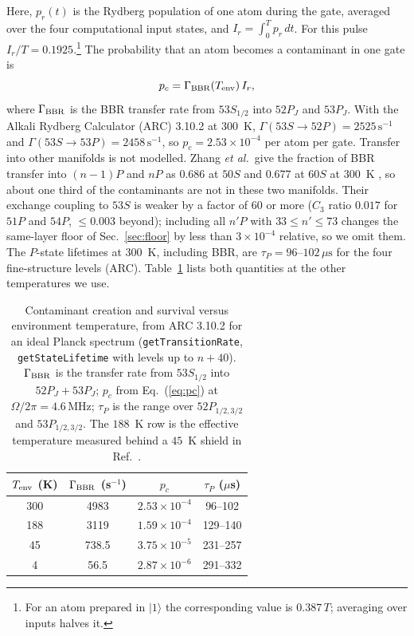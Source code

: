 \documentclass[aps,pra,twocolumn,superscriptaddress,longbibliography,floatfix]{revtex4-2}
\newcommand{\us}{\,\mu\mathrm{s}}
\newcommand{\MHz}{\,\mathrm{MHz}}
\begin{document}
Here, $p_r(t)$ is the Rydberg population of one atom during the gate, averaged over the four computational input states, and $I_r=\int_0^T p_r\,dt$. For this pulse $I_r/T=0.1925$.\footnote{For an atom prepared in $|1\rangle$ the corresponding value is $0.387\,T$; averaging over inputs halves it.} The probability that an atom becomes a contaminant in one gate is
\begin{equation}
p_c=\Gamma_{\rm BBR}(T_{\rm env})\,I_r ,
\label{eq:pc}
\end{equation}
where $\Gamma_{\rm BBR}$ is the BBR transfer rate from $53S_{1/2}$ into $52P_J$ and $53P_J$. With the Alkali Rydberg Calculator (ARC) 3.10.2 \cite{ARC} at $300$~K, $\Gamma(53S\to52P)=2525\,\mathrm{s}^{-1}$ and $\Gamma(53S\to53P)=2458\,\mathrm{s}^{-1}$, so $p_c=2.53\times10^{-4}$ per atom per gate. Transfer into other manifolds is not modelled. Zhang \textit{et al.}\ give the fraction of BBR transfer into $(n-1)P$ and $nP$ as $0.686$ at $50S$ and $0.677$ at $60S$ at $300$~K \cite{Zhang2026}, so about one third of the contaminants are not in these two manifolds. Their exchange coupling to $53S$ is weaker by a factor of 60 or more ($C_3$ ratio $0.017$ for $51P$ and $54P$, $\le0.003$ beyond); including all $n'P$ with $33\le n'\le73$ changes the same-layer floor of Sec.~\ref{sec:floor} by less than $3\times10^{-4}$ relative, so we omit them. The $P$-state lifetimes at $300$~K, including BBR, are $\tau_P=96$--$102\us$ for the four fine-structure levels (ARC). Table~\ref{tab:T} lists both quantities at the other temperatures we use.

\begin{table}[b]
\caption{Contaminant creation and survival versus environment temperature, from ARC 3.10.2 for an ideal Planck spectrum (\texttt{getTransitionRate}, \texttt{getStateLifetime} with levels up to $n+40$). $\Gamma_{\rm BBR}$ is the transfer rate from $53S_{1/2}$ into $52P_J+53P_J$; $p_c$ from Eq.~(\ref{eq:pc}) at $\Omega/2\pi=4.6\MHz$; $\tau_P$ is the range over $52P_{1/2,3/2}$ and $53P_{1/2,3/2}$. The $188$~K row is the effective temperature measured behind a $45$~K shield in Ref.~\cite{Zhang2026}.}
\label{tab:T}
\begin{ruledtabular}
\begin{tabular}{cccc}
$T_{\rm env}$ (K) & $\Gamma_{\rm BBR}$ (s$^{-1}$) & $p_c$ & $\tau_P$ ($\mu$s)\\ \hline
300 & 4983 & $2.53\times10^{-4}$ & 96--102\\
188 & 3119 & $1.59\times10^{-4}$ & 129--140\\
45  & 738.5 & $3.75\times10^{-5}$ & 231--257\\
4   & 56.5 & $2.87\times10^{-6}$ & 291--332\\
\end{tabular}
\end{ruledtabular}
\end{table}
\end{document}
